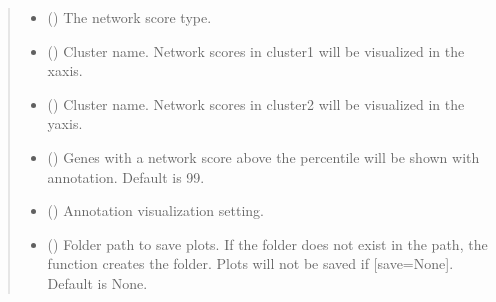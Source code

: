 \documentclass[letterpaper,10pt,english]{sphinxmanual}
\begin{document}
\begin{fulllineitems}
\begin{fulllineitems}
\begin{quote}
\begin{description}
\begin{itemize}
\item {} 
 () \textendash{} The network score type.

\item {} 
 () \textendash{} Cluster name. Network scores in cluster1 will be visualized in the x\sphinxhyphen{}axis.

\item {} 
 () \textendash{} Cluster name. Network scores in cluster2 will be visualized in the y\sphinxhyphen{}axis.

\item {} 
 () \textendash{} Genes with a network score above the percentile will be shown with annotation. Default is 99.

\item {} 
 (\sphinxstyleliteralemphasis{\sphinxupquote{(}}\sphinxstyleliteralemphasis{\sphinxupquote{, }}\sphinxstyleliteralemphasis{\sphinxupquote{)}}) \textendash{} Annotation visualization setting.

\item {} 
 () \textendash{} Folder path to save plots. If the folder does not exist in the path, the function creates the folder.
Plots will not be saved if {[}save=None{]}. Default is None.

\end{itemize}

\end{description}\end{quote}

\end{fulllineitems}



\end{fulllineitems}
\end{document}
